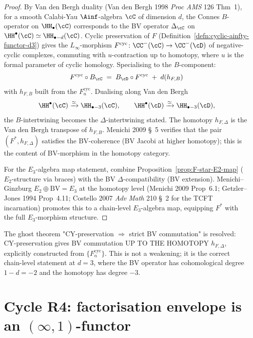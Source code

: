\begin{proof}
By Van den Bergh duality (Van den Bergh 1998 \emph{Proc AMS} 126 Thm~1),
for a smooth Calabi-Yau $\Ainf$-algebra $\cC$ of dimension $d$, the
Connes $B$-operator on $\HH_\bullet(\cC)$ corresponds to the BV
operator $\Delta_\cC$ on $\HH^\bullet(\cC) \simeq \HH_{\bullet - d}(\cC)$.
Cyclic preservation of $F$ (Definition~\ref{defn:cyclic-ainfty-functor-d3})
gives the $L_\infty$-morphism
$F^{\mathrm{cyc}} \colon \CC^{-}(\cC) \to \CC^{-}(\cD)$ of negative-
cyclic complexes, commuting with $u$-contraction up to homotopy, where
$u$ is the formal parameter of cyclic homology.  Specialising to the
$B$-component:
\[
 F^{\mathrm{cyc}} \circ B_\cC
 \;=\;
 B_\cD \circ F^{\mathrm{cyc}}
 \;+\; d(h_{F, B})
\]
with $h_{F,B}$ built from the $F_n^{\mathrm{cyc}}$.  Dualising along
Van den Bergh
\[
  \HH^\bullet(\cC) \xrightarrow{\simeq} \HH_{\bullet - 3}(\cC),
  \qquad
  \HH^\bullet(\cD) \xrightarrow{\simeq} \HH_{\bullet - 3}(\cD),
\]
the $B$-intertwining becomes the $\Delta$-intertwining stated.  The
homotopy $h_{F,\Delta}$ is the Van den Bergh transpose of $h_{F,B}$.
Menichi 2009 \S~5 verifies that the pair $(F^*, h_{F,\Delta})$
satisfies the BV-coherence (BV Jacobi at higher homotopy); this is the
content of BV-morphism in the homotopy category.

For the $E_3$-algebra map statement, combine
Proposition~\ref{prop:F-star-E2-map} ($E_2$-structure via
braces) with the BV $\Delta$-compatibility (BV extension).
Menichi--Ginzburg $E_2 \oplus \mathrm{BV} = E_3$ at the homotopy level
(Menichi 2009 Prop~6.1; Getzler--Jones 1994 Prop~4.11; Costello 2007
\emph{Adv Math} 210 \S~2 for the TCFT incarnation) promotes this to a
chain-level $E_3$-algebra map, equipping $F^*$ with the full
$E_3$-morphism structure.
\end{proof}

\begin{remark}
\label{rem:ghost-1-resolution}
The ghost theorem "CY-preservation $\Rightarrow$ strict BV commutation"
is resolved: CY-preservation gives BV commutation UP TO THE HOMOTOPY
$h_{F,\Delta}$, explicitly constructed from $\{F_n^{\mathrm{cyc}}\}$.
This is not a weakening; it is the correct chain-level statement at
$d = 3$, where the BV operator has cohomological degree $1 - d = -2$
and the homotopy has degree $-3$.
\end{remark}

\section*{Cycle R4: factorisation envelope is an $(\infty,1)$-functor}

